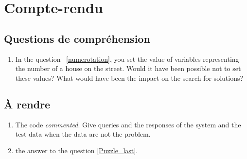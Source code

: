 \section{Compte-rendu}

\subsection{Questions de compréhension}

\begin{enumerate}
\item In the question ~\ref{numerotation}, you set the value of variables representing the number of a house on the street. Would it have been possible not to set these values? What would have been the impact on the search for solutions?
\end{enumerate}

\subsection{À rendre}

\begin{enumerate}
\item The code \eclipse{} \emph{commented}.  Give queries
   \eclipse{} and the responses of the system and the test data when the data are not the problem.
\item the answer to the question \ref{Puzzle_last}.
\end{enumerate}

